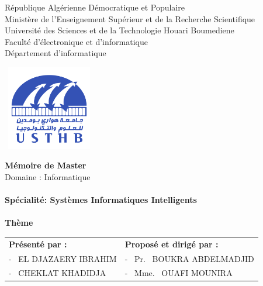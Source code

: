 


\begin{titlepage}

\begin{center}
\normalsize{République Algérienne Démocratique et Populaire}\\
\normalsize{Ministère de l'Enseignement Supérieur et de la Recherche Scientifique}\\
\normalsize{Université des Sciences et de la Technologie Houari Boumediene}\\
\normalsize{Faculté d'électronique et d'informatique}\\
\normalsize{Département d'informatique}\\
\end{center}
\begin{center}
\includegraphics[width=4cm,height=3.7cm]{Cover/usthb.png}
\end{center}


\begin{center}
\huge{\textbf{Mémoire de Master}}\\
\large{Domaine : Informatique}\\
\textbf{}\\
\Large{\textbf{Spécialité: Systèmes Informatiques Intelligents}}\\
\textbf{}\\
\bigskip
\vspace*{0.3cm}
\Huge{\textbf{Thème}}
\end{center}
\vspace*{1.5cm}

\begin{table}[h]
\centering
\begin{tabular}{p{8cm}p{6.5cm}}
\textbf{Présenté par :} & \textbf{Proposé et dirigé par :}\\
- \, EL DJAZAERY IBRAHIM  & - \, Pr. \, BOUKRA ABDELMADJID\\
- \, CHEKLAT KHADIDJA  & - \, Mme. \, OUAFI MOUNIRA\\
\end{tabular}
\end{table}


\end{titlepage}
